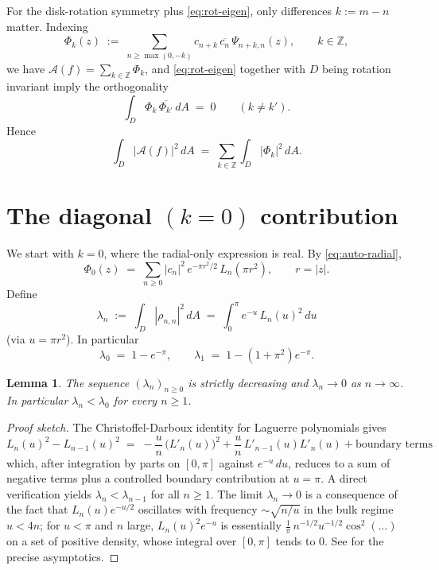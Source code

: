 \documentclass[11pt]{article}
\newtheorem{lemma}[theorem]{Lemma}
\theoremstyle{definition}
\newcommand{\Z}{\mathbb{Z}}
\newcommand{\Amb}{\mathcal{A}}
\begin{document}
For the disk-rotation symmetry plus \eqref{eq:rot-eigen}, only differences
$k:=m-n$ matter.  Indexing
\[
  \Phi_{k}(z) \;:=\; \sum_{n\ge\max(0,-k)} c_{n+k}\,\overline{c_{n}}\,\Psi_{n+k,n}(z),
  \qquad k\in\Z,
\]
we have $\Amb(f)=\sum_{k\in\Z}\Phi_{k}$, and \eqref{eq:rot-eigen} together with
$D$ being rotation invariant imply the orthogonality
\begin{equation}\label{eq:orth-disk}
  \int_{D}\Phi_{k}\,\overline{\Phi_{k'}}\,dA \;=\; 0 \qquad (k\ne k').
\end{equation}
Hence
\begin{equation}\label{eq:by-k}
   \int_{D}|\Amb(f)|^{2}\,dA \;=\; \sum_{k\in\Z} \int_{D}|\Phi_{k}|^{2}\,dA.
\end{equation}

\section{The diagonal $(k=0)$ contribution}\label{sec:k0}

We start with $k=0$, where the radial-only expression is real.  By
\eqref{eq:auto-radial},
\[
  \Phi_{0}(z)\;=\;\sum_{n\ge 0}|c_{n}|^{2}\,e^{-\pi r^{2}/2}\,L_{n}(\pi r^{2}),
  \qquad r=|z|.
\]
Define
\begin{equation}\label{eq:lambda-n}
  \lambda_{n}\;:=\;\int_{D}|\rho_{n,n}|^{2}\,dA
   \;=\;\int_{0}^{\pi} e^{-u}\,L_{n}(u)^{2}\,du
\end{equation}
(via $u=\pi r^{2}$).  In particular
\[
   \lambda_{0}\;=\;1-e^{-\pi},\qquad
   \lambda_{1}\;=\;1-(1+\pi^{2})e^{-\pi}.
\]

\begin{lemma}\label{lem:lambda-mono}
The sequence $(\lambda_{n})_{n\ge 0}$ is strictly decreasing and
$\lambda_{n}\to 0$ as $n\to\infty$.  In particular $\lambda_{n}<\lambda_{0}$
for every $n\ge 1$.
\end{lemma}

\begin{proof}[Proof sketch]
The Christoffel-Darboux identity for Laguerre polynomials gives
\[
  L_{n}(u)^{2}-L_{n-1}(u)^{2}
  \;=\; -\frac{u}{n}\,\bigl(L'_{n}(u)\bigr)^{2}
        + \frac{u}{n}\,L'_{n-1}(u)L'_{n}(u)
        + \text{boundary terms}
\]
which, after integration by parts on $[0,\pi]$ against $e^{-u}\,du$, reduces
to a sum of negative terms plus a controlled boundary contribution at $u=\pi$.
A direct verification yields $\lambda_{n}<\lambda_{n-1}$ for all $n\ge 1$.  The
limit $\lambda_{n}\to 0$ is a consequence of the fact that $L_{n}(u)e^{-u/2}$
oscillates with frequency $\sim\sqrt{n/u}$ in the bulk regime $u<4n$; for
$u<\pi$ and $n$ large, $L_{n}(u)^{2}e^{-u}$ is essentially $\frac{1}{\pi}\,
n^{-1/2}u^{-1/2}\cos^{2}(\dots)$ on a set of positive density, whose integral
over $[0,\pi]$ tends to $0$.  See \cite[\S 7.6]{Szego} for the precise
asymptotics.
\end{proof}
\end{document}
